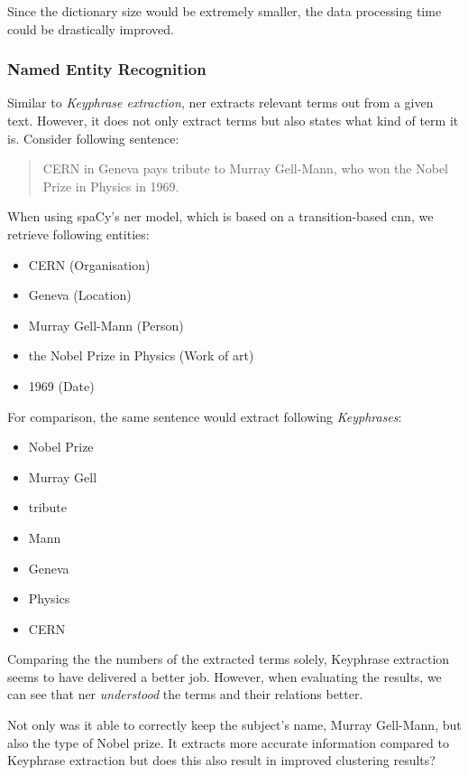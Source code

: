 Since the dictionary size would be extremely smaller,
the data processing time could be drastically improved.

\subsubsection{Named Entity Recognition}
Similar to \textit{Keyphrase extraction}, \gls{ner} extracts relevant terms out from a given text.
However, it does not only extract terms but also states what kind of term it is.
Consider following sentence:

\begin{quotation}
    CERN in Geneva pays tribute to Murray Gell-Mann, who won the Nobel Prize in Physics in 1969.
\end{quotation}

When using spaCy's \gls{ner} model, which is based on a transition-based \gls{cnn}\cite{LampleBSKD16},
we retrieve following entities:

\begin{itemize}
    \item CERN (Organisation)
    \item Geneva (Location)
    \item Murray Gell-Mann (Person)
    \item the Nobel Prize in Physics (Work of art)
    \item 1969 (Date)
\end{itemize}

For comparison, the same sentence would extract following \textit{Keyphrases}:

\begin{itemize}
    \item Nobel Prize
    \item Murray Gell
    \item tribute
    \item Mann
    \item Geneva
    \item Physics
    \item CERN
\end{itemize}

Comparing the the numbers of the extracted terms solely, Keyphrase extraction seems to have delivered a better job.
However, when evaluating the results, we can see that \gls{ner} \textit{understood} the terms and their
relations better.

Not only was it able to correctly keep the subject's name, Murray Gell-Mann, but also the type of Nobel prize.
It extracts more accurate information compared to Keyphrase extraction but does this also result
in improved clustering results?

